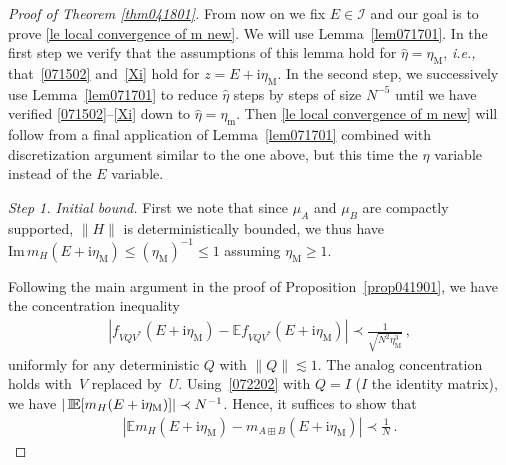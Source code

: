 \documentclass[10pt,reqno]{amsart}
\numberwithin{equation}{section}
\theoremstyle{plain}
\numberwithin{kevin}{section}
\theoremstyle{remark}
\renewcommand{\Im}{\mathrm{Im}\,}
\newcommand{\ii}{\mathrm{i}}
\newcommand{\ie}{\emph{i.e., }}
\DeclareMathOperator*{\IE}{ \mathbb{I}\mkern-2mu\mathbb{E}}
\begin{document}
\begin{proof}[Proof of Theorem \ref{thm041801}]
 
 From now on we fix  $E\in \mathcal{I}$ and our goal is to prove \eqref{le local convergence of m new}. We will use   Lemma~\ref{lem071701}. In the first step we verify 
 that the assumptions  of this lemma hold for $\widehat\eta =\eta_{\mathrm{M}}$, \ie
 that~\eqref{071502} and~\eqref{Xi}  hold for $z=E+\ii \eta_{\mathrm{M}}$. In the second step,
 we successively use Lemma~\ref{lem071701} to reduce $\widehat\eta$ steps by steps of size $N^{-5}$
 until we have verified  \eqref{071502}--\eqref{Xi} down to $\widehat\eta =\eta_{\mathrm{m}}$.
 Then \eqref{le local convergence of m new} will follow from 
 a final application of Lemma~\ref{lem071701} combined with discretization argument 
  similar to the one above, but this time the $\eta$ variable instead of the $E$ variable.
 
 
 {\it Step 1. Initial bound.}
   First we note that 
  since $\mu_A$ and $\mu_B$ are compactly supported, $\|H\|$ is deterministically bounded, we thus have $\Im m_H(E+\ii \eta_{\mathrm{M}})\le(\eta_{\mathrm{M}})^{-1}\le 1$ assuming $\eta_{\mathrm{M}}\ge 1$. 


 Following the main argument in the proof of Proposition~\ref{prop041901}, we have the concentration inequality 
\begin{align}
|f_{VQV^*}(E+\ii\eta_{\mathrm{M}})-\mathbb{E} f_{VQV^*}(E+\ii\eta_{\mathrm{M}})|\prec \frac{1}{\sqrt{N^2\eta_{\mathrm{M}}^{3}}}\,, \label{072202}
\end{align}
uniformly for any deterministic $Q$ with $\|Q\|\lesssim 1$. The analog concentration holds with~$V$ replaced by~$U$.  Using~\eqref{072202} with $Q=I$ ($I$ the identity matrix), we have $|\IE[m_H(E+\ii \eta_{\mathrm{M}})]|\prec{N^{-1}} $. Hence, it suffices to show that
\begin{align}
|\mathbb{E}m_H(E+\ii \eta_{\mathrm{M}})-m_{A\boxplus B}(E+\ii \eta_{\mathrm{M}})|\prec \frac{1}{N}\,. \label{072205}
\end{align}


\end{proof}
\end{document}
